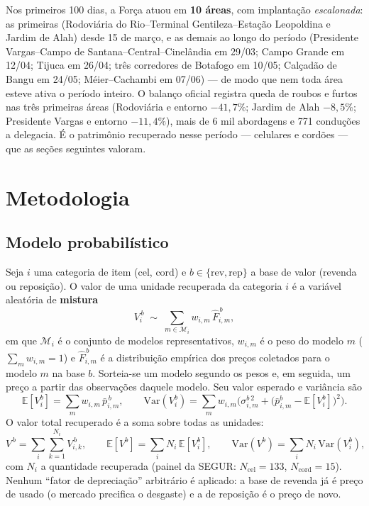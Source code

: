\documentclass[11pt,a4paper]{article}
\begin{document}
Nos primeiros 100 dias, a Força atuou em \textbf{10 áreas}, com implantação \emph{escalonada}: as
primeiras (Rodoviária do Rio--Terminal Gentileza--Estação Leopoldina e Jardim de Alah) desde 15 de
março, e as demais ao longo do período (Presidente Vargas--Campo de Santana--Central--Cinelândia em
29/03; Campo Grande em 12/04; Tijuca em 26/04; três corredores de Botafogo em 10/05; Calçadão de
Bangu em 24/05; Méier--Cachambi em 07/06) --- de modo que nem toda área esteve ativa o período
inteiro. O balanço oficial registra queda de roubos e furtos nas três primeiras áreas (Rodoviária e
entorno $-41{,}7\%$; Jardim de Alah $-8{,}5\%$; Presidente Vargas e entorno $-11{,}4\%$), mais de 6
mil abordagens e 771 conduções a delegacia. É o patrimônio recuperado nesse período --- celulares e
cordões --- que as seções seguintes valoram.

\section{Metodologia}

\subsection{Modelo probabilístico}
Seja $i$ uma categoria de item ($\text{cel}$, $\text{cord}$) e
$b\in\{\text{rev},\text{rep}\}$ a base de valor (revenda ou reposição). O valor de uma unidade
recuperada da categoria $i$ é a variável aleatória de \textbf{mistura}
\begin{equation}
  V_i^{\,b}\;\sim\;\sum_{m\in\mathcal{M}_i} w_{i,m}\,\hat F_{i,m}^{\,b},
  \label{eq:mix}
\end{equation}
em que $\mathcal{M}_i$ é o conjunto de modelos representativos, $w_{i,m}$ é o peso do modelo $m$
($\sum_m w_{i,m}=1$) e $\hat F_{i,m}^{\,b}$ é a distribuição empírica dos preços coletados para o
modelo $m$ na base $b$. Sorteia-se um modelo segundo os pesos e, em seguida, um preço a partir das
observações daquele modelo. Seu valor esperado e variância são
\begin{equation}
  \mathbb{E}[V_i^{b}]=\sum_m w_{i,m}\,\bar p_{i,m}^{\,b},
  \qquad
  \mathrm{Var}(V_i^{b})=\sum_m w_{i,m}\Big(\sigma_{i,m}^{b\,2}+\big(\bar p_{i,m}^{b}-\mathbb{E}[V_i^b]\big)^2\Big).
  \label{eq:moments}
\end{equation}
O valor total recuperado é a soma sobre todas as unidades:
\begin{equation}
  V^{\,b}=\sum_{i}\sum_{k=1}^{N_i} V_{i,k}^{\,b},
  \qquad
  \mathbb{E}[V^{b}]=\sum_i N_i\,\mathbb{E}[V_i^{b}],
  \qquad
  \mathrm{Var}(V^{b})=\sum_i N_i\,\mathrm{Var}(V_i^{b}),
  \label{eq:total}
\end{equation}
com $N_i$ a quantidade recuperada (painel da SEGUR: $N_{\text{cel}}=133$, $N_{\text{cord}}=15$).
Nenhum ``fator de depreciação'' arbitrário é aplicado: a base de revenda já é preço de usado (o
mercado precifica o desgaste) e a de reposição é o preço de novo.
\end{document}
